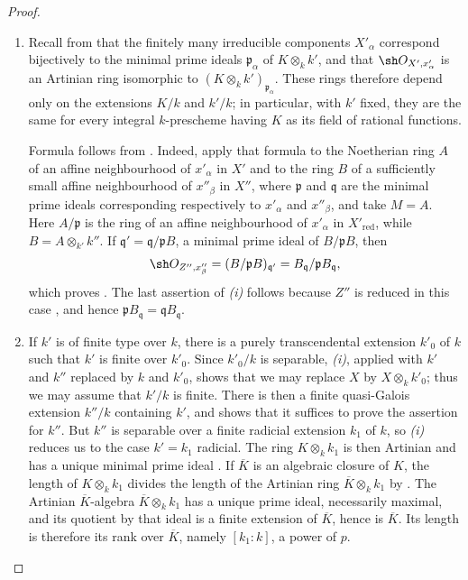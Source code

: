 \begin{proof}
\begin{enumerate}
\item[\rm(i)]
Recall from  that the finitely many irreducible
components $X'_\alpha$ correspond bijectively to the minimal prime
ideals $\mathfrak p_\alpha$ of $K\otimes_k k'$, and that
$\sh O_{X',x'_\alpha}$ is an Artinian ring isomorphic to
$(K\otimes_k k')_{\mathfrak p_\alpha}$.
These rings therefore depend only on the extensions $K/k$ and $k'/k$;
in particular, with $k'$ fixed, they are the same for every integral
$k$-prescheme having $K$ as its field of rational functions.

Formula  follows from .
Indeed, apply that formula to the Noetherian ring $A$ of an affine
neighbourhood of $x'_\alpha$ in $X'$ and to the ring $B$ of a
sufficiently small affine neighbourhood of $x''_\beta$ in $X''$,
where $\mathfrak p$ and $\mathfrak q$ are the minimal prime ideals
corresponding respectively to $x'_\alpha$ and $x''_\beta$, and take
$M=A$.
Here $A/\mathfrak p$ is the ring of an affine neighbourhood of
$x'_\alpha$ in $X'_{\mathrm{red}}$, while
$B=A\otimes_{k'}k''$.
If $\mathfrak q'=\mathfrak q/\mathfrak pB$, a minimal prime ideal of
$B/\mathfrak pB$, then
\[
\sh O_{Z'',x''_\beta}
=(B/\mathfrak pB)_{\mathfrak q'}
=B_{\mathfrak q}/\mathfrak pB_{\mathfrak q},
\]
which proves .
The last assertion of \emph{(i)} follows because $Z''$ is reduced in
this case , and hence
$\mathfrak pB_{\mathfrak q}=\mathfrak qB_{\mathfrak q}$.

\item[\rm(ii)]
If $k'$ is of finite type over $k$, there is a purely transcendental
extension $k'_0$ of $k$ such that $k'$ is finite over $k'_0$.
Since $k'_0/k$ is separable, \emph{(i)}, applied with $k'$ and $k''$
replaced by $k$ and $k'_0$, shows that we may replace $X$ by
$X\otimes_k k'_0$; thus we may assume that $k'/k$ is finite.
There is then a finite quasi-Galois extension $k''/k$ containing
$k'$, and  shows that it suffices to prove the
assertion for $k''$.
But $k''$ is separable over a finite radicial extension $k_1$ of $k$,
so \emph{(i)} reduces us to the case $k'=k_1$ radicial.
The ring $K\otimes_k k_1$ is then Artinian and has a unique minimal
prime ideal .
If $\overline K$ is an algebraic closure of $K$, the length of
$K\otimes_k k_1$ divides the length of the Artinian ring
$\overline K\otimes_k k_1$ by .
The Artinian $\overline K$-algebra
$\overline K\otimes_k k_1$ has a unique prime ideal, necessarily
maximal, and its quotient by that ideal is a finite extension of
$\overline K$, hence is $\overline K$.
Its length is therefore its rank over $\overline K$, namely
$[k_1:k]$, a power of $p$.


\end{enumerate}
\end{proof}
